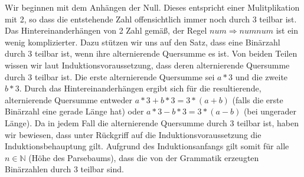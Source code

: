 \documentclass[a4paper,10pt]{scrartcl}
\begin{document}
Wir beginnen mit dem Anhängen der Null. Dieses entspricht einer Mulitplikation mit 2, so dass die entstehende Zahl offensichtlich immer noch durch 3 teilbar ist.
Das Hintereinanderhängen von 2 Zahl gemäß, der Regel $num \Rightarrow num num$ ist ein wenig komplizierter. Dazu stützen wir uns auf den Satz, dass eine Binärzahl durch 3 teilbar ist, wenn ihre alternierende Quersumme es ist.
Von beiden Teilen wissen wir laut Induktionsvoraussetzung, dass deren alternierende Quersumme durch 3 teilbar ist. Die erste alternierende Quersumme sei $a * 3$ und die zweite $b * 3$. Durch das Hintereinanderhängen ergibt sich für die resultierende,
alternierende Quersumme entweder $a * 3 + b * 3 = 3 * (a + b)$ (falls die erste Binärzahl eine gerade Länge hat) oder $a * 3 - b * 3 = 3 * (a - b)$ (bei ungerader Länge). Da in jedem Fall die alternierende Quersumme durch 3 teilbar ist, haben wir bewiesen, dass
unter Rückgriff auf die Induktionsvoraussetzung die Induktionsbehauptung gilt. Aufgrund des Induktionsanfangs gilt somit für alle $n \in \mathbb{N}$ (Höhe des Parsebaums), dass die von der Grammatik erzeugten Binärzahlen durch 3 teilbar sind.
\end{document}
